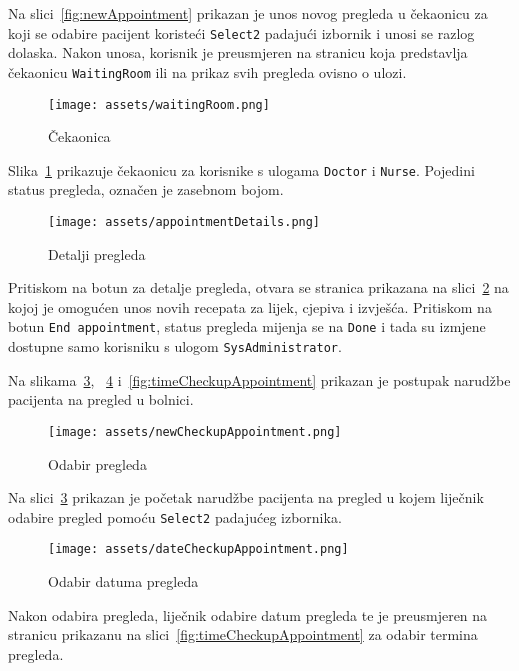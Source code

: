 Na slici~\ref{fig:newAppointment} prikazan je unos novog pregleda u čekaonicu za koji se odabire pacijent koristeći \texttt{Select2} padajući izbornik i unosi se razlog dolaska. Nakon unosa, korisnik je preusmjeren na stranicu koja predstavlja čekaonicu \texttt{WaitingRoom} ili na prikaz svih pregleda ovisno o ulozi.

\begin{figure}[H]
	\texttt{[image: assets/waitingRoom.png]}
	\centering
	\caption{Čekaonica}
	\label{fig:waitingRoom}
\end{figure}

Slika~\ref{fig:waitingRoom} prikazuje čekaonicu za korisnike s ulogama \texttt{Doctor} i \texttt{Nurse}. Pojedini status pregleda, označen je zasebnom bojom.

\begin{figure}[H]
	\texttt{[image: assets/appointmentDetails.png]}
	\centering
	\caption{Detalji pregleda}
	\label{fig:appointmentDetails}
\end{figure}

Pritiskom na botun za detalje pregleda, otvara se stranica prikazana na slici~\ref{fig:appointmentDetails} na kojoj je omogućen unos novih recepata za lijek, cjepiva i izvješća. Pritiskom na botun \texttt{End appointment}, status pregleda mijenja se na \texttt{Done} i tada su izmjene dostupne samo korisniku s ulogom \texttt{SysAdministrator}.

Na slikama~\ref{fig:newCheckupAppointment}, ~\ref{fig:dateCheckupAppointment} i~\ref{fig:timeCheckupAppointment} prikazan je postupak narudžbe pacijenta na pregled u bolnici.

\begin{figure}[H]
	\texttt{[image: assets/newCheckupAppointment.png]}
	\centering
	\caption{Odabir pregleda}
	\label{fig:newCheckupAppointment}
\end{figure}

Na slici~\ref{fig:newCheckupAppointment} prikazan je početak narudžbe pacijenta na pregled u kojem liječnik odabire pregled pomoću \texttt{Select2} padajućeg izbornika.

\begin{figure}[H]
	\texttt{[image: assets/dateCheckupAppointment.png]}
	\centering
	\caption{Odabir datuma pregleda}
	\label{fig:dateCheckupAppointment}
\end{figure}

Nakon odabira pregleda, liječnik odabire datum pregleda te je preusmjeren na stranicu prikazanu na slici~\ref{fig:timeCheckupAppointment} za odabir termina pregleda.


